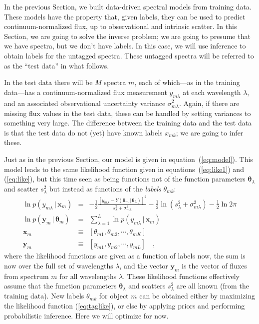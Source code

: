 \documentclass[12pt, preprint]{aastex}
\newcommand{\sectionname}{Section}
\newcommand{\set}[1]{\bm{#1}}
\newcommand{\given}{\,|\,}
\begin{document}
In the previous \sectionname, we built data-driven spectral models
from training data.
These models have the property that, given labels, they can be used to
predict continuum-normalized flux, up to observational and intrinsic
scatter.
In this \sectionname, we are going to solve the inverse problem; we
are going to presume that we have spectra, but we don't have labels.
In this case, we will use inference to obtain labels for the untagged
spectra.
These untagged spectra will be referred to as the ``test data'' in
what follows.

In the test data there will be $M$ spectra $m$, each of which---as in
the training data---has a continuum-normalized flux measurement
$y_{m\lambda}$ at each wavelength $\lambda$, and an
associated observational uncertainty variance $\sigma_{m\lambda}^2$.
Again, if there are missing flux values in the test data, these can be
handled by setting variances to something very large.
The difference between the training data and the test data is that the
test data do not (yet) have known labels $x_{mk}$; we are going to infer
these.

Just as in the previous \sectionname, our model is given in
equation~(\ref{eq:model}).
This model leads to the same likelihood function given in
equations~(\ref{eq:like1}) and (\ref{eq:like}), but this time seen as
being functions not of the function parameters $\set{\theta}_\lambda$ and
scatter $s_\lambda^2$ but instead as functions of the \emph{labels}
$\theta_{mk}$:
\begin{eqnarray}
\ln p(y_{m\lambda}\given\set{x}_m) &=&
 -\frac{1}{2}\frac{[y_{m\lambda} - Y(\set{\theta}_m\given\set{\theta}_\lambda)]^2}{s_\lambda^2 + \sigma_{m\lambda}^2}
 -\frac{1}{2}\ln(s_\lambda^2 + \sigma_{m\lambda}^2)
 -\frac{1}{2}\ln 2\pi
\\
\ln p(\set{y}_m\given\set{\theta}_m) &=&
 \sum_{\lambda=1}^L \ln p(y_{m\lambda}\given\set{x}_m)
\label{eq:taglike}\\
\set{x}_m &\equiv& [\theta_{m1}, \theta_{m2}, \cdots, \theta_{mK}]
\\
\set{y}_m &\equiv& [y_{m1}, y_{m2}, \cdots, y_{mL}]
\quad,
\end{eqnarray}
where the likelihood functions are given as a function of labels now,
the sum is now over the full set of wavelengths
$\lambda$, and the vector $\set{y}_m$ is the vector of fluxes from
spectrum $m$ for all wavelengths $\lambda$.
These likelihood functions effectively assume that the function
parameters $\set{\theta}_\lambda$ and scatters $s_\lambda^2$ are all known (from
the training data).
New labels $\theta_{mk}$ for object $m$ can be obtained either by maximizing
the likelihood function (\ref{eq:taglike}), or else by applying priors
and performing probabilistic inference.
Here we will optimize for now.
\end{document}
